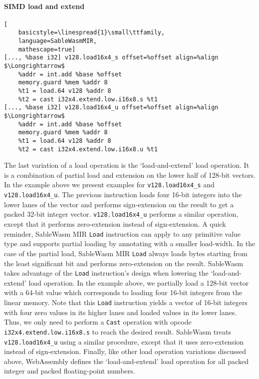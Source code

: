 \paragraph{SIMD load and extend} \quad
\begin{lstlisting}[
    basicstyle=\linespread{1}\small\ttfamily, 
    language=SableWasmMIR, 
    mathescape=true]
[..., %base i32] v128.load16x4_s offset=%offset align=%align $\Longrightarrow$
    %addr = int.add %base %offset
    memory.guard %mem %addr 8
    %t1 = load.64 v128 %addr 8
    %t2 = cast i32x4.extend.low.i16x8.s %t1
[..., %base i32] v128.load16x4_u offset=%offset align=%align $\Longrightarrow$
    %addr = int.add %base %offset
    memory.guard %mem %addr 8
    %t1 = load.64 v128 %addr 8
    %t2 = cast i32x4.extend.low.i16x8.u %t1
\end{lstlisting}
The last variation of a load operation is the `load-and-extend' load operation.
It is a combination of partial load and extension on the lower half of
128-bit vectors. In the example above we present examples for
\texttt{v128.load16x4\_s} and \texttt{v128.load16x4\_u}. The previous
instruction loads four 16-bit integers into the lower lanes of the vector and
performs sign-extension on the result to get a packed 32-bit integer vector.
\texttt{v128.load16x4\_u} performs a similar operation, except that it performs
zero-extension instead of sign-extension. A quick reminder, SableWasm MIR
\texttt{Load} instruction can apply to any primitive value type and supports
partial loading by annotating with a smaller load-width. In the case of the
partial load, SableWasm MIR \texttt{Load} always loads bytes starting from the
least significant bit and performs zero-extension on the result. SableWasm takes
advantage of the \texttt{Load} instruction's design when lowering the
`load-and-extend' load operation. In the example above, we partially load a
128-bit vector with a 64-bit value which corresponds to loading four
16-bit integers from the linear memory. Note that this \texttt{Load} instruction
yields a vector of 16-bit integers with four zero values in its higher lanes and
loaded values in its lower lanes. Thus, we only need to perform a \texttt{Cast}
operation with opcode \texttt{i32x4.extend.low.i16x8.s} to reach the desired
result. SableWasm treats \texttt{v128.load16x4\_u} using a similar procedure,
except that it uses zero-extension instead of sign-extension. Finally, like
other load operation variations discussed above, WebAssembly defines the
`load-and-extend' load operation for all packed integer and packed
floating-point numbers.

